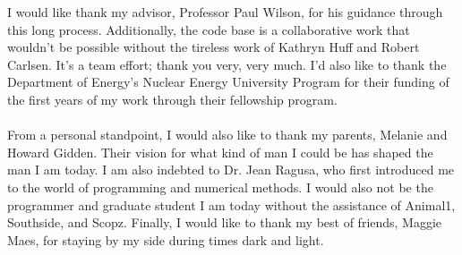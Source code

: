 

I would like thank my advisor, Professor Paul Wilson, for his guidance through
this long process. Additionally, the \Cyclus code base is a collaborative work
that wouldn't be possible without the tireless work of Kathryn Huff and Robert
Carlsen. It's a team effort; thank you very, very much. I'd also like to thank
the Department of Energy's Nuclear Energy University Program for their funding
of the first years of my work through their fellowship program.
\\ \\
From a personal standpoint, I would also like to thank my parents, Melanie and
Howard Gidden. Their vision for what kind of man I could be has shaped the man I
am today. I am also indebted to Dr. Jean Ragusa, who first introduced me to the
world of programming and numerical methods. I would also not be the programmer
and graduate student I am today without the assistance of Animal1, Southside,
and Scopz. Finally, I would like to thank my best of friends, Maggie Maes, for
staying by my side during times dark and light.
